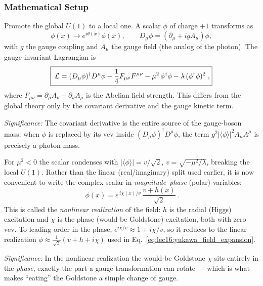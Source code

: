 \subsubsection*{Mathematical Setup}

Promote the global $U(1)$ to a local one. A scalar $\phi$ of charge $+1$ transforms as
\begin{equation}
  \phi(x)\to e^{i\theta(x)}\phi(x),
  \qquad
  D_\mu\phi=(\partial_\mu+i g A_\mu)\phi ,
  \label{eq:lec16:local_u1_transformation}
\end{equation}
with $g$ the gauge coupling and $A_\mu$ the gauge field (the analog of the photon). The gauge-invariant Lagrangian is
\begin{equation}
  \boxed{\;\mathcal{L}
  =(D_\mu\phi)^\dagger D^\mu\phi
   -\frac14 F_{\mu\nu}F^{\mu\nu}
   -\mu^2\,\phi^\dagger\phi
   -\lambda\,(\phi^\dagger\phi)^2\; ,}
  \label{eq:lec16:local_u1_lagrangian}
\end{equation}
where $F_{\mu\nu}=\partial_\mu A_\nu-\partial_\nu A_\mu$ is the Abelian field strength. This differs from the global theory only by the covariant derivative and the gauge kinetic term.

\textit{Significance:} The covariant derivative is the entire source of the gauge-boson mass: when $\phi$ is replaced by its vev inside $(D_\mu\phi)^\dagger D^\mu\phi$, the term $g^2|\langle\phi\rangle|^2 A_\mu A^\mu$ is precisely a photon mass.

For $\mu^2<0$ the scalar condenses with $|\langle\phi\rangle|=v/\sqrt2$, $v=\sqrt{-\mu^2/\lambda}$, breaking the local $U(1)$. Rather than the linear (real/imaginary) split used earlier, it is now convenient to write the complex scalar in \emph{magnitude--phase} (polar) variables:
\begin{equation}
  \boxed{\;\phi(x)=e^{\,i\chi(x)/v}\,\frac{v+h(x)}{\sqrt2}\; .}
  \label{eq:lec16:nonlinear_realization}
\end{equation}
This is called the \emph{nonlinear realization} of the field: $h$ is the radial (Higgs) excitation and $\chi$ is the phase (would-be Goldstone) excitation, both with zero vev. To leading order in the phase, $e^{i\chi/v}\approx 1+i\chi/v$, so it reduces to the linear realization $\phi\approx\tfrac{1}{\sqrt2}(v+h+i\chi)$ used in Eq.~\eqref{eq:lec16:yukawa_field_expansion}.

\textit{Significance:} In the nonlinear realization the would-be Goldstone $\chi$ sits entirely in the \emph{phase}, exactly the part a gauge transformation can rotate --- which is what makes ``eating'' the Goldstone a simple change of gauge.

